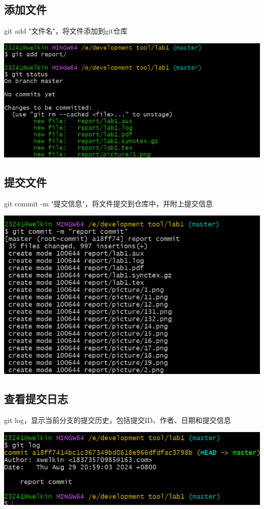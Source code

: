 \documentclass[UTF8,a4paper]{ctexart}
\begin{document}
\begin{sloppypar}
	\subsection{添加文件}
	git add "文件名"，将文件添加到git仓库
	
	\includegraphics[width = 16cm]{3}
	
	\subsection{提交文件}
	git commit -m "提交信息"，将文件提交到仓库中，并附上提交信息
	
	\includegraphics[width = 16cm]{4}
	
	\subsection{查看提交日志}
	git log，显示当前分支的提交历史，包括提交ID、作者、日期和提交信息
	
	\includegraphics[width = 16cm]{5}
	

\end{sloppypar}
\end{document}
